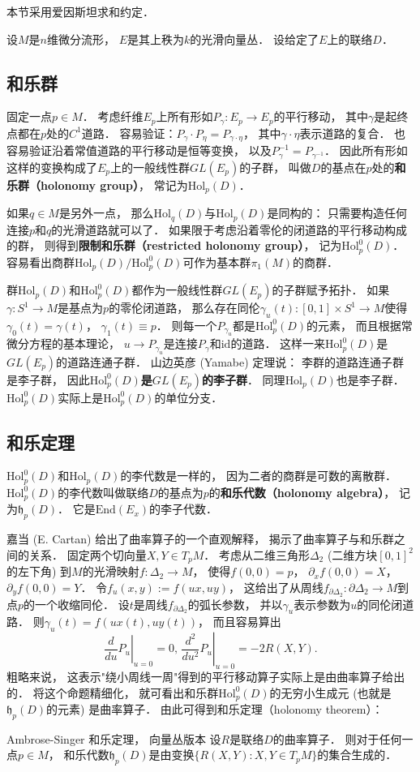 
本节采用爱因斯坦求和约定．

设$M$是$n$维微分流形， $E$是其上秩为$k$的光滑向量丛． 设给定了$E$上的联络$D$．

\subsection{和乐群}
固定一点$p\in M$． 考虑纤维$E_p$上所有形如$P_\gamma:E_p\to E_p$的平行移动， 其中$\gamma$是起终点都在$p$处的$C^1$道路． 容易验证：$P_\gamma\cdot P_\eta=P_{\gamma\cdot\eta}$，
其中$\gamma\cdot\eta$表示道路的复合． 也容易验证沿着常值道路的平行移动是恒等变换， 以及$P_\gamma^{-1}=P_{\gamma^{-1}}$． 因此所有形如这样的变换构成了$E_p$上的一般线性群$GL(E_p)$的子群， 叫做$D$的基点在$p$处的\textbf{和乐群（holonomy group）}， 常记为$\text{Hol}_p(D)$． 

如果$q\in M$是另外一点， 那么$\text{Hol}_q(D)$与$\text{Hol}_p(D)$是同构的： 只需要构造任何连接$p$和$q$的光滑道路就可以了． 如果限于考虑沿着零伦的闭道路的平行移动构成的群， 则得到\textbf{限制和乐群（restricted holonomy group）}， 记为$\text{Hol}^0_p(D)$． 容易看出商群$\text{Hol}_p(D)/\text{Hol}_p^0(D)$可作为基本群$\pi_1(M)$的商群．

群$\text{Hol}_p(D)$和$\text{Hol}_p^0(D)$都作为一般线性群$GL(E_p)$的子群赋予拓扑． 如果$\gamma:S^1\to M$是基点为$p$的零伦闭道路， 那么存在同伦$\gamma_u(t):[0,1]\times S^1\to M$使得$\gamma_0(t)=\gamma(t)$， $\gamma_1(t)\equiv p$． 则每一个$P_{\gamma_u}$都是$\text{Hol}_p^0(D)$的元素， 而且根据常微分方程的基本理论， $u\to P_{\gamma_u}$是连接$P_\gamma$和$\text{id}$的道路． 这样一来$\text{Hol}_p^0(D)$是$GL(E_p)$的道路连通子群． 山边英彦 (Yamabe) 定理说： 李群的道路连通子群是李子群， 因此\textbf{$\text{Hol}_p^0(D)$是$GL(E_p)$的李子群}． 同理$\text{Hol}_p(D)$也是李子群． $\text{Hol}_p^0(D)$实际上是$\text{Hol}_p^0(D)$的单位分支．

\subsection{和乐定理}
$\text{Hol}_p^0(D)$和$\text{Hol}_p(D)$的李代数是一样的， 因为二者的商群是可数的离散群． $\text{Hol}_p^0(D)$的李代数叫做联络$D$的基点为$p$的\textbf{和乐代数（holonomy algebra）}， 记为$\mathfrak{h}_p(D)$．  它是$\text{End}(E_x)$的李子代数． 

嘉当 (E. Cartan) 给出了曲率算子的一个直观解释， 揭示了曲率算子与和乐群之间的关系． 固定两个切向量$X,Y\in T_pM$． 考虑从二维三角形$\Delta_2$ (二维方块$[0,1]^2$的左下角) 到$M$的光滑映射$f:\Delta_2\to M$， 使得$f(0,0)=p$， $\partial_xf(0,0)=X$， $\partial_yf(0,0)=Y$． 令$f_u(x,y):=f(ux,uy)$， 这给出了从周线$f_{\partial\Delta_2}:\partial\Delta_2\to M$到点$p$的一个收缩同伦． 设$t$是周线$f_{\partial\Delta_2}$的弧长参数， 并以$\gamma_u$表示参数为$u$的同伦闭道路． 则$\gamma_u(t)=f(ux(t),uy(t))$， 而且容易算出
$$
\left.\frac{d}{du}P_u\right|_{u=0}=0,\,\left.\frac{d^2}{du^2}P_u\right|_{u=0}=-2R(X,Y).
$$
粗略来说， 这表示"绕小周线一周"得到的平行移动算子实际上是由曲率算子给出的． 将这个命题精细化， 就可看出和乐群$\text{Hol}_p^0(D)$的无穷小生成元 (也就是$\mathfrak{h}_p(D)$的元素) 是曲率算子． 由此可得到和乐定理（holonomy theorem）：

\begin{theorem}{Ambrose-Singer 和乐定理， 向量丛版本}
设$R$是联络$D$的曲率算子． 则对于任何一点$p\in M$， 和乐代数$\mathfrak{h}_p(D)$是由变换$\{R(X,Y):X,Y\in T_pM\}$的集合生成的．
\end{theorem}
